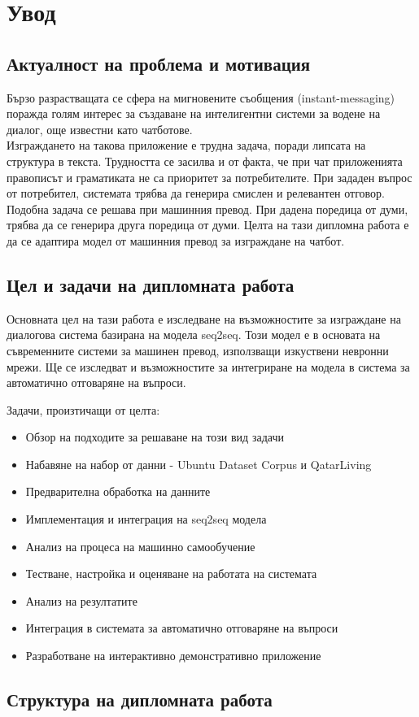 \chapter{Увод}

\label{Chapter1}


\section{Актуалност на проблема и мотивация}
Бързо разрастващата се сфера на мигновените съобщения (instant-messaging) поражда голям интерес за създаване на интелигентни системи за водене на диалог, още известни като чатботове.\\
Изграждането на такова приложение е трудна задача, поради липсата на структура в текста. Трудността се засилва и от факта, че при чат приложенията правописът и граматиката не са приоритет за потребителите. При зададен въпрос от потребител, системата трябва да генерира смислен и релевантен отговор. \\
Подобна задача се решава при машинния превод. При дадена поредица от думи, трябва да се генерира друга поредица от думи. Целта на тази дипломна работа е да се адаптира модел от машинния превод за изграждане на чатбот.



\section{Цел и задачи на дипломната работа}
Основната цел на тази работа е изследване на възможностите за изграждане на диалогова система базирана на модела seq2seq. Този модел е в основата на съвременните системи за машинен превод, използващи изкуствени невронни мрежи. Ще се изследват и възможностите за интегриране на модела в система за автоматично отговаряне на въпроси.

Задачи, произтичащи от целта:
\begin{itemize}
	\item Обзор на подходите за решаване на този вид задачи
	\item Набавяне на набор от данни - Ubuntu Dataset Corpus и QatarLiving
	\item Предварителна обработка на данните
	\item Имплементация и интеграция на seq2seq модела
	\item Анализ на процеса на машинно самообучение
	\item Тестване, настройка и оценяване на работата на системата
	\item Анализ на резултатите
	\item Интеграция в системата за автоматично отговаряне на въпроси
	\item Разработване на интерактивно демонстративно приложение
\end{itemize}


\section{Структура на дипломната работа}


